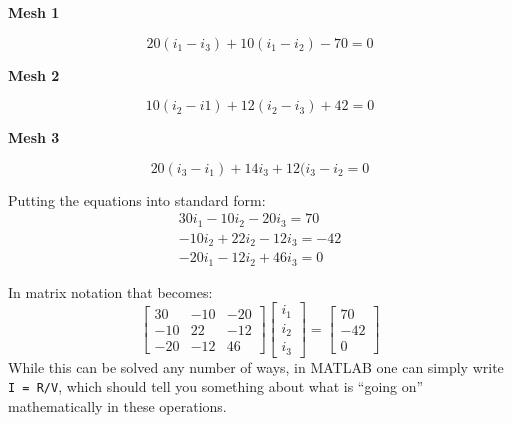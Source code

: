 \documentclass[11pt]{book}
\begin{document}
\begin{center}
	\textbf{Mesh 1}
\end{center}
\begin{equation}
	20(i_1 - i_3) + 10(i_1 - i_2) - 70 = 0
\end{equation}

\begin{center}
	\textbf{Mesh 2}
\end{center}
\begin{equation}
	10(i_2 - i1) + 12(i_2 - i_3) + 42 = 0
\end{equation}

\begin{center}
	\textbf{Mesh 3}
\end{center}
\begin{equation}
	20(i_3 - i_1) + 14i_3 + 12(i_3 - i_2 = 0
\end{equation}

Putting the equations into standard form:
\begin{eqnarray}
	30i_1 - 10i_2 - 20i_3 = 70 \\
	-10 i_2 +22 i_2 - 12 i_3 = -42 \\
	-20 i_1 - 12i_2 +46 i_3 = 0
\end{eqnarray}

In matrix notation that becomes:
\begin{equation}
	\begin{bmatrix}
		30 & -10 & -20 \\ -10 & 22 & -12 \\ -20 & -12 & 46
	\end{bmatrix}
	\begin{bmatrix}
		i_1 \\ i_2 \\ i_3
	\end{bmatrix}
	=
	\begin{bmatrix}
		70 \\ -42 \\ 0
	\end{bmatrix}
\end{equation}
While this can be solved any number of ways, in MATLAB one can simply write \texttt{I = R/V}, which should tell you something about what is ``going on'' mathematically in these operations.
\end{document}
